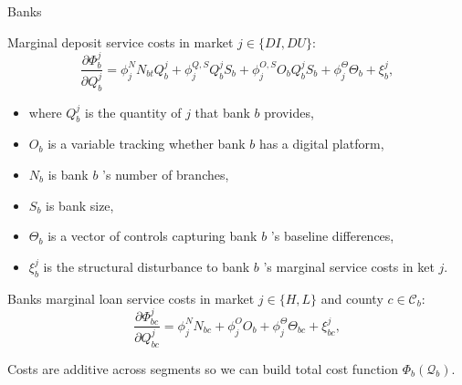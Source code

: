 \documentclass[notes,10pt, aspectratio=169]{beamer}
\newenvironment{wideitemize}{\itemize\addtolength{\itemsep}{10pt}}{\enditemize}
\begin{document}
\begin{frame}{Banks}

\begin{wideitemize}
    \item Marginal deposit service costs in market $j\in\{D I, D U\}$:
    $$
\frac{\partial \Phi_b^j}{\partial Q_b^j}=\phi_j^N N_{b t} Q_b^j+\phi_j^{Q, S} Q_b^j S_b+\phi_j^{O, S} O_b Q_b^j S_b+\phi_j^{\Theta} \Theta_b+\xi_b^j,
$$


\begin{itemize}
    \item where $Q_b^j$ is the quantity of $j$ that bank $b$ provides,
    \item $O_b$ is a variable tracking whether bank $b$ has a digital platform,
    \item $N_b$ is bank $b$ 's number of branches,
    \item $S_b$ is bank size,
    \item $\Theta_b$ is a vector of controls capturing bank $b$ 's baseline differences,
    \item $\xi_b^j$ is the structural disturbance to bank $b$ 's marginal service costs in ket $j$.
\end{itemize}
\item Banks marginal loan service costs in market $j\in\{H, L\}$ and county $c \in \mathcal{C}_b$:
$$
\frac{\partial \Phi_{b c}^j}{\partial Q_{b c}^j}=\phi_j^N N_{b c}+\phi_j^O O_b+\phi_j^{\Theta} \Theta_{b c}+\xi_{b c}^j,
$$

\item Costs are additive across segments so we can build total cost function $\Phi_b\left(\mathcal{Q}_b\right)$.

\end{wideitemize}
\end{frame}
\end{document}
